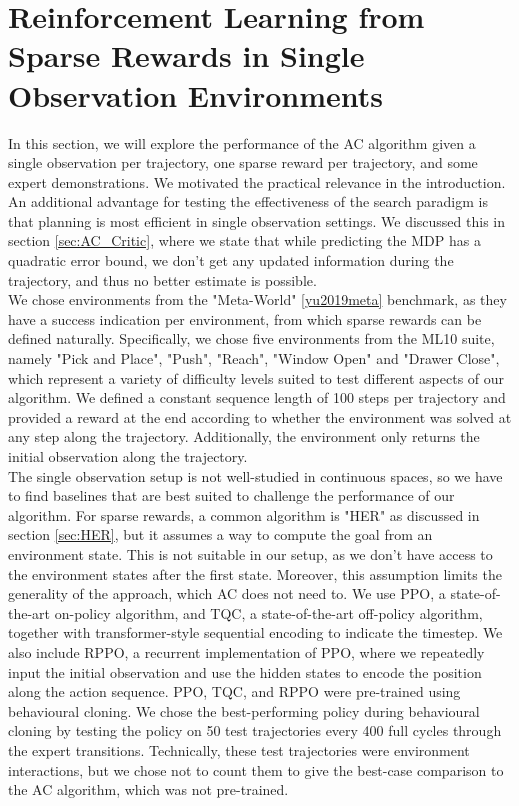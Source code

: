 \section{Reinforcement Learning from Sparse Rewards in Single Observation Environments}
In this section, we will explore the performance of the AC algorithm given a single observation per trajectory, one sparse reward per trajectory, and some expert demonstrations.
We motivated the practical relevance in the introduction. An additional advantage for testing the effectiveness of the search paradigm is that planning is most efficient in
single observation settings.
We discussed this in section \ref{sec:AC_Critic}, where we state that while predicting the MDP has a quadratic error bound, we don't get any updated information
during the trajectory, and thus no better estimate is possible. \\

We chose environments from the "Meta-World" \ref{yu2019meta} benchmark, as they have a success indication per environment, from which sparse rewards can be defined naturally.
Specifically, we chose five environments from the ML10 suite, namely "Pick and Place", "Push", "Reach", "Window Open" and "Drawer Close", which represent a variety
of difficulty levels suited to test different aspects of our algorithm. We defined a constant sequence length of 100 steps per trajectory and provided
a reward at the end according to whether the environment was solved at any step along the trajectory. Additionally, the environment
only returns the initial observation along the trajectory.\\

The single observation setup is not well-studied in continuous spaces, so we have to find baselines that are best suited to challenge the performance of our algorithm. For sparse rewards, a common
algorithm is "HER" as discussed in section \ref{sec:HER}, but it assumes a way to compute the goal from an environment state. This is not suitable in our setup, as we don't have access to the environment
states after the first state. Moreover, this assumption limits the generality of the approach, which AC does not need to.
We use PPO, a state-of-the-art on-policy algorithm, and TQC, a state-of-the-art off-policy algorithm, together with transformer-style sequential encoding to indicate the timestep. We also include
RPPO, a recurrent implementation of PPO, where we repeatedly input the initial observation and use the hidden states to encode the position along the action sequence.
PPO, TQC, and RPPO were pre-trained using behavioural cloning. We chose the best-performing policy during behavioural cloning by testing the policy on 50 test
trajectories every 400 full cycles through the
expert transitions. Technically, these test trajectories were environment interactions, but we chose not to count them to give the best-case comparison to the AC algorithm, which was not pre-trained.\

